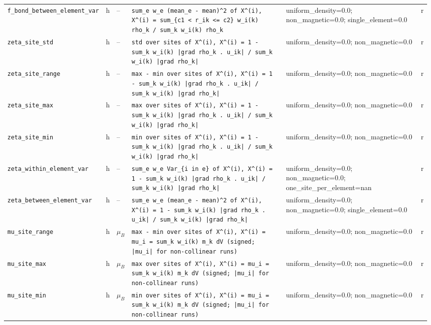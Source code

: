 \begin{table}[p]
\begin{tabular}{p{3.3cm}cp{1.4cm}p{6.6cm}p{2.3cm}c}
\texttt{f\_bond\_between\_element\_var} & h & -- & \texttt{sum\_e w\_e (mean\_e - mean)\^{}2 of X\^{}(i),  X\^{}(i) = sum\_\{c1 < r\_ik <= c2\} w\_i(k) rho\_k / sum\_k w\_i(k) rho\_k} & uniform\_density=0.0; non\_magnetic=0.0; single\_element=0.0 & r \\
\texttt{zeta\_site\_std} & h & -- & \texttt{std over sites of X\^{}(i),  X\^{}(i) = 1 - sum\_k w\_i(k) |grad rho\_k . u\_ik| / sum\_k w\_i(k) |grad rho\_k|} & uniform\_density=0.0; non\_magnetic=0.0 & r \\
\texttt{zeta\_site\_range} & h & -- & \texttt{max - min over sites of X\^{}(i),  X\^{}(i) = 1 - sum\_k w\_i(k) |grad rho\_k . u\_ik| / sum\_k w\_i(k) |grad rho\_k|} & uniform\_density=0.0; non\_magnetic=0.0 & r \\
\texttt{zeta\_site\_max} & h & -- & \texttt{max over sites of X\^{}(i),  X\^{}(i) = 1 - sum\_k w\_i(k) |grad rho\_k . u\_ik| / sum\_k w\_i(k) |grad rho\_k|} & uniform\_density=0.0; non\_magnetic=0.0 & r \\
\texttt{zeta\_site\_min} & h & -- & \texttt{min over sites of X\^{}(i),  X\^{}(i) = 1 - sum\_k w\_i(k) |grad rho\_k . u\_ik| / sum\_k w\_i(k) |grad rho\_k|} & uniform\_density=0.0; non\_magnetic=0.0 & r \\
\texttt{zeta\_within\_element\_var} & h & -- & \texttt{sum\_e w\_e Var\_\{i in e\} of X\^{}(i),  X\^{}(i) = 1 - sum\_k w\_i(k) |grad rho\_k . u\_ik| / sum\_k w\_i(k) |grad rho\_k|} & uniform\_density=0.0; non\_magnetic=0.0; one\_site\_per\_element=nan & r \\
\texttt{zeta\_between\_element\_var} & h & -- & \texttt{sum\_e w\_e (mean\_e - mean)\^{}2 of X\^{}(i),  X\^{}(i) = 1 - sum\_k w\_i(k) |grad rho\_k . u\_ik| / sum\_k w\_i(k) |grad rho\_k|} & uniform\_density=0.0; non\_magnetic=0.0; single\_element=0.0 & r \\
\texttt{mu\_site\_range} & h & $\mu_B$ & \texttt{max - min over sites of X\^{}(i),  X\^{}(i) = mu\_i = sum\_k w\_i(k) m\_k dV (signed; |mu\_i| for non-collinear runs)} & uniform\_density=0.0; non\_magnetic=0.0 & r \\
\texttt{mu\_site\_max} & h & $\mu_B$ & \texttt{max over sites of X\^{}(i),  X\^{}(i) = mu\_i = sum\_k w\_i(k) m\_k dV (signed; |mu\_i| for non-collinear runs)} & uniform\_density=0.0; non\_magnetic=0.0 & r \\
\texttt{mu\_site\_min} & h & $\mu_B$ & \texttt{min over sites of X\^{}(i),  X\^{}(i) = mu\_i = sum\_k w\_i(k) m\_k dV (signed; |mu\_i| for non-collinear runs)} & uniform\_density=0.0; non\_magnetic=0.0 & r \\

\end{tabular}
\end{table}
